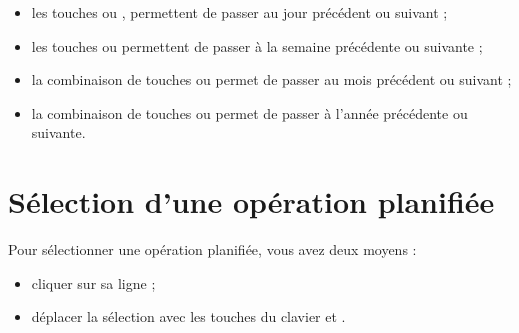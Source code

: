 \begin{itemize}
	\ifIllustration
	\label{planned-transactions-calendar-img}
	\fi
	
	\item les touches  ou , permettent de passer au jour précédent ou suivant ;
	\item les touches  ou  permettent de passer à la semaine précédente ou suivante ;
	\item la combinaison de touches  ou \newline {} permet de passer au mois précédent ou suivant ;
	\item la combinaison de touches  ou \newline {} permet de passer à l'année précédente ou suivante.
\end{itemize}

\ifIllustration
\fi


\section{Sélection d'une opération planifiée\label{plannedtransactions-selection}}


Pour sélectionner une opération planifiée, vous avez deux moyens :

\begin{itemize}
	 \item cliquer sur sa ligne ;
	 \item déplacer la sélection avec les touches du clavier  et .
\end{itemize}

